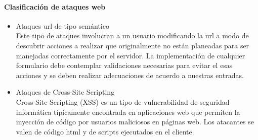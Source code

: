 \documentclass[12pt, a4paper, titlepage]{article}
\begin{document}
		\paragraph{Clasificación de ataques web}
		\begin{itemize}
		\item Ataques \acrshort{url} de tipo semántico\\
		Este tipo de ataques involucran a un usuario modificando la \acrshort{url} a modo de descubrir acciones a realizar que originalmente no están planeadas para ser manejadas correctamente por el servidor. La implementación de cualquier formulario debe contemplar validaciones necesarias para evitar el esas acciones y se deben realizar adecuaciones de acuerdo a nuestras entradas.
		\item Ataques de Cross-Site Scripting \\
		Cross-Site Scripting (XSS) es un tipo de vulnerabilidad de seguridad informática típicamente encontrada en aplicaciones web que permiten la inyección de código por usuarios maliciosos en páginas web. Los atacantes se valen de código \acrshort{html} y de scripts ejecutados en el cliente. 
		

\end{itemize}
\end{document}
